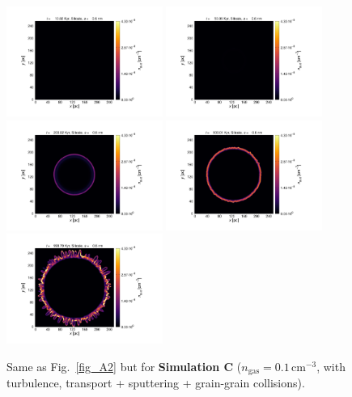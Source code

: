 \documentclass[fleqn,usenatbib]{mnras}
\begin{document}
\begin{figure}
  \includegraphics[trim=2.8cm 1.5cm 9.3cm 2.0cm, clip=true,page=4,height = 3.6cm]{Pics/Pics_C2/Density_1_00041.pdf}\hspace*{-0.05cm} 
 \includegraphics[trim=5.2cm 1.5cm 9.3cm 2.0cm, clip=true,page=4,height = 3.6cm]{Pics/Pics_C2/Density_1_00201.pdf}\hspace*{-0.05cm} 
 \includegraphics[trim=5.2cm 1.5cm 9.3cm 2.0cm, clip=true,page=4,height = 3.6cm]{Pics/Pics_C2/Density_1_00801.pdf}\hspace*{-0.05cm}  
 \includegraphics[trim=5.2cm 1.5cm 9.3cm 2.0cm, clip=true,page=4,height = 3.6cm]{Pics/Pics_C2/Density_1_02001.pdf}\hspace*{-0.05cm} 
 \includegraphics[trim=5.2cm 1.5cm 3.2cm 2.0cm, clip=true,page=4,height = 3.6cm]{Pics/Pics_C2/Density_1_04000.pdf}\\
  \caption{Same as Fig.~\ref{fig_A2} but for \textbf{Simulation C} ($n_\text{gas}=0.1\,\text{cm}^{-3}$, with turbulence, transport + sputtering + grain-grain collisions).}
   \label{fig_C2} 
  \end{figure}  
  
\end{document}
